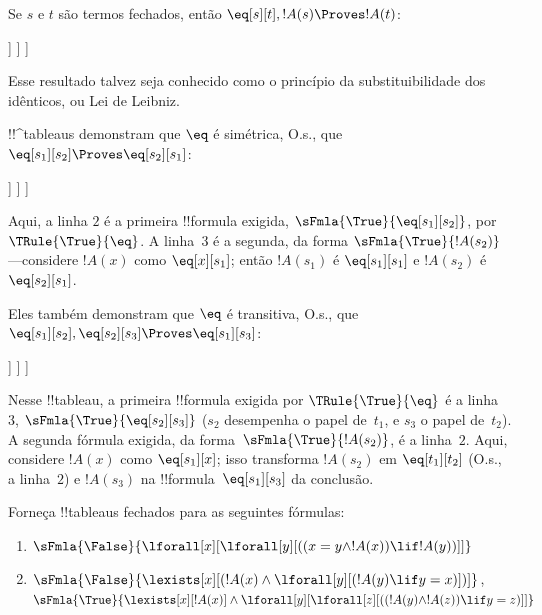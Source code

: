 \documentclass[../../../include/open-logic-section]{subfiles}
\begin{document}
\begin{ex}
Se $s$ e $t$ são termos fechados, então $\eq[s][t], !A(s)
\Proves !A(t)$:
\begin{oltableau}
  [\sFmla{\False}{\formula{A}(t)}, just = \TAss
    [\sFmla{\True}{\eq[s][t]}, just = \TAss
      [\sFmla{\True}{\formula{A}(s)}, just = \TAss
        [\sFmla{\True}{\formula{A}(t)}, just={\TRule{\True}{\eq}[2, 3]}, close]
      ]
    ]
  ]
\end{oltableau}
Esse resultado talvez seja conhecido como o princípio da substituibilidade dos
idênticos, ou Lei de Leibniz.

!!^{tableau}s demonstram que $\eq$ é simétrica, O.s.\@, que $\eq[s_1][s_2]
\Proves \eq[s_2][s_1]$:
\begin{oltableau}
  [\sFmla{\False}{\eq[s_2][s_1]}, just = \TAss
    [\sFmla{\True}{\eq[s_1][s_2]}, just = \TAss
      [\sFmla{\True}{\eq[s_1][s_1]}, just = {$\eq$}
        [\sFmla{\True}{\eq[s_2][s_1]}, just = {\TRule{\True}{\eq}[2, 3]}, close]
      ]
    ]
  ]
\end{oltableau}
Aqui, a linha $2$ é a primeira !!{formula} exigida,
$\sFmla{\True}{\eq[s_1][s_2]}$, por $\TRule{\True}{\eq}$.
A linha~$3$ é a segunda, da forma $\sFmla{\True}{!A(s_2)}$---considere
$!A(x)$ como
$\eq[x][s_1]$; então $!A(s_1)$ é $\eq[s_1][s_1]$ e $!A(s_2)$ é $\eq[s_2][s_1]$.

Eles também demonstram que $\eq$ é transitiva, O.s.\@, que $\eq[s_1][s_2],
\eq[s_2][s_3] \Proves \eq[s_1][s_3]$:
\begin{oltableau}
  [\sFmla{\False}{\eq[s_1][s_3]}, just = \TAss
    [\sFmla{\True}{\eq[s_1][s_2]}, just = \TAss
      [\sFmla{\True}{\eq[s_2][s_3]}, just = \TAss
        [\sFmla{\True}{\eq[s_1][s_3]}, just = {\TRule{\True}{\eq}[3, 2]}, close]
      ]
    ]
  ]
\end{oltableau}
Nesse !!{tableau}, a primeira !!{formula} exigida por
$\TRule{\True}{\eq}$ é a linha~$3$, $\sFmla{\True}{\eq[s_2][s_3]}$
($s_2$ desempenha o papel de~$t_1$, e $s_3$ o papel de~$t_2$). A
segunda fórmula exigida, da forma~$\sFmla{\True}{!A(s_2)}$, é a linha~$2$.
Aqui, considere $!A(x)$ como $\eq[s_1][x]$; isso transforma $!A(s_2)$ em
$\eq[t_1][t_2]$ (O.s.\@, a linha~$2$) e $!A(s_3)$ na
!!{formula}~$\eq[s_1][s_3]$ da conclusão.
\end{ex}

\begin{prob}
Forneça !!{tableau}s fechados para as seguintes fórmulas:
\begin{enumerate}
\item $\sFmla{\False}{\lforall[x][\lforall[y][((x = y \land !A(x))
      \lif !A(y))]]}$
\item $\sFmla{\False}{\lexists[x][(!A(x) \land
    \lforall[y][(!A(y) \lif y = x)])]}$,\\
  $\sFmla{\True}{\lexists[x][!A(x)] \land
    \lforall[y][\lforall[z][((!A(y) \land !A(z)) \lif y = z)]]}$
\end{enumerate}
\end{prob}
\end{document}

